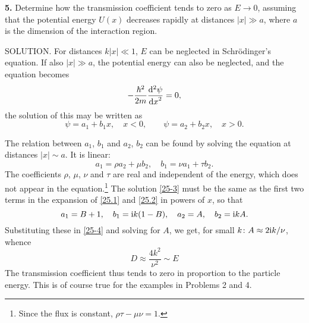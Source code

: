 {\textbf{5.} Determine how the transmission coefficient tends to zero as $ E \to0 $, assuming that the potential energy $ U (x) $ decreases rapidly at distances $ |x|\gg a $, where $ a $ is the dimension of the interaction region.





SOLUTION. For distances $ k |x| \ll1 $, $ E $ can be neglected in Schr\"odinger's equation. If also $ |x|\gg a $, the potential energy can also be neglected, and the equation becomes
\[ -\frac{\hbar^2}{2m}\frac{\mathrm{d}^2\psi}{{\mathrm{d} x}^2}=0, \]
the solution of this may be written as
\begin{equation}\label{25-3}
\psi=a_1+b_1x,\quad x<0,\qquad\psi=a_2+b_2x,\quad x>0.\tag{1}
\end{equation}

The relation between $ a_1 $, $ b_1 $ and $ a_2 $, $ b_2 $ can be found by solving the equation at distances $ |x|\sim a $. It is linear:
\begin{equation}\label{25-4}
a_1=\rho a_2+\mu b_2,\quad b_1=\nu a_1+\tau b_2.\tag{2}
\end{equation}
The coefficients $ \rho $, $ \mu $, $ \nu $ and $ \tau $ are real and independent of the energy, which does not appear in the equation.\footnote{Since the flux is constant, $ \rho\tau-\mu\nu= 1 $.
} The solution \eqref{25-3} must be the same as the first two terms in the expansion of \eqref{25.1} and \eqref{25.2} in powers of $ x $, so that
\[a_1=B+1,\quad b_1=\mathrm{i} k(1-B),\quad a_2=A,\quad b_2=\mathrm{i} kA. \]
Substituting these in \eqref{25-4} and solving for $ A $, we get, for small $ k\colon A \approx2\mathrm{i} k/\nu $, whence 
\[ D\approx\frac{4k^2}{\nu^2}\sim E \]
The transmission coefficient thus tends to zero in proportion to the particle energy. This is of course true for the examples in Problems 2 and 4.}
